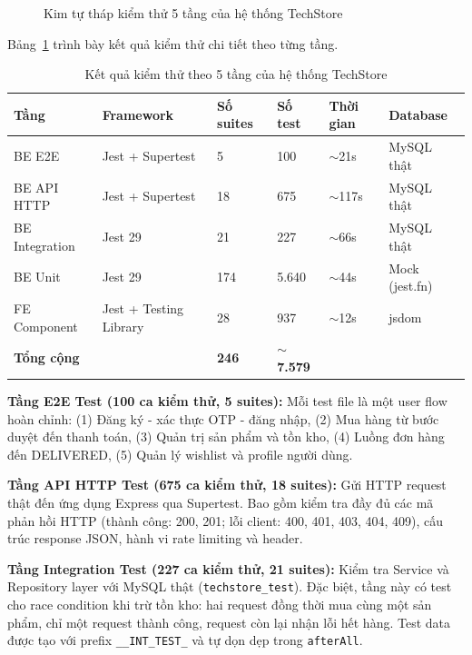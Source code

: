 \begin{figure}[H]
  \centering
  \caption{Kim tự tháp kiểm thử 5 tầng của hệ thống TechStore}
  \label{fig:testing_pyramid}
\end{figure}

Bảng~\ref{tab:test_results} trình bày kết quả kiểm thử chi tiết theo từng tầng.

\begin{table}[H]
  \centering
  \caption{Kết quả kiểm thử theo 5 tầng của hệ thống TechStore}
  \label{tab:test_results}
  \footnotesize
  \begin{tabular}{|l|p{3.5cm}|p{1.8cm}|p{1.3cm}|p{1.5cm}|p{2.2cm}|}
    \hline
    \textbf{Tầng} & \textbf{Framework} & \textbf{Số suites} & \textbf{Số test} & \textbf{Thời gian} & \textbf{Database} \\
    \hline
    BE E2E & Jest + Supertest & 5 & 100 & $\sim$21s & MySQL thật \\
    \hline
    BE API HTTP & Jest + Supertest & 18 & 675 & $\sim$117s & MySQL thật \\
    \hline
    BE Integration & Jest 29 & 21 & 227 & $\sim$66s & MySQL thật \\
    \hline
    BE Unit & Jest 29 & 174 & 5.640 & $\sim$44s & Mock (jest.fn) \\
    \hline
    FE Component & Jest + Testing Library & 28 & 937 & $\sim$12s & jsdom \\
    \hline
    \textbf{Tổng cộng} & & \textbf{246} & \textbf{$\sim$7.579} & & \\
    \hline
  \end{tabular}
  \normalsize
\end{table}

\textbf{Tầng E2E Test (100 ca kiểm thử, 5 suites):} Mỗi test file là một user flow hoàn chỉnh: (1) Đăng ký - xác thực OTP - đăng nhập, (2) Mua hàng từ bước duyệt đến thanh toán, (3) Quản trị sản phẩm và tồn kho, (4) Luồng đơn hàng đến DELIVERED, (5) Quản lý wishlist và profile người dùng.

\textbf{Tầng API HTTP Test (675 ca kiểm thử, 18 suites):} Gửi HTTP request thật đến ứng dụng Express qua Supertest. Bao gồm kiểm tra đầy đủ các mã phản hồi HTTP (thành công: 200, 201; lỗi client: 400, 401, 403, 404, 409), cấu trúc response JSON, hành vi rate limiting và header.

\textbf{Tầng Integration Test (227 ca kiểm thử, 21 suites):} Kiểm tra Service và Repository layer với MySQL thật (\texttt{techstore\_test}). Đặc biệt, tầng này có test cho race condition khi trừ tồn kho: hai request đồng thời mua cùng một sản phẩm, chỉ một request thành công, request còn lại nhận lỗi hết hàng. Test data được tạo với prefix \texttt{\_\_INT\_TEST\_} và tự dọn dẹp trong \texttt{afterAll}.


